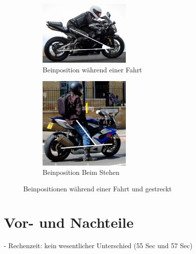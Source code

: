 \begin{figure}[H]
	\centering
	\begin{subfigure}{\textwidth}
		\centering
		\includegraphics[width=0.5\textwidth]{Bilder/MotorbikeDriving2.png}
		\caption{Beinposition während einer Fahrt}
		\label{fig:MotorbikeDriving}
	\end{subfigure}
	\hfill
	\begin{subfigure}{\textwidth}
		\centering
		\includegraphics[width=0.5\textwidth]{Bilder/MotorbikeStanding2.png}
		\caption{Beinposition Beim Stehen}
		\label{fig:MotorbikeStanding2}
	\end{subfigure}
	\caption{Beinpositionen während einer Fahrt und gestreckt}
	\label{fig:MotorbikeDrivingStanding}
\end{figure}


\section{Vor- und Nachteile}
- Rechenzeit: kein wesentlicher Unterschied (55 Sec und 57 Sec)





 